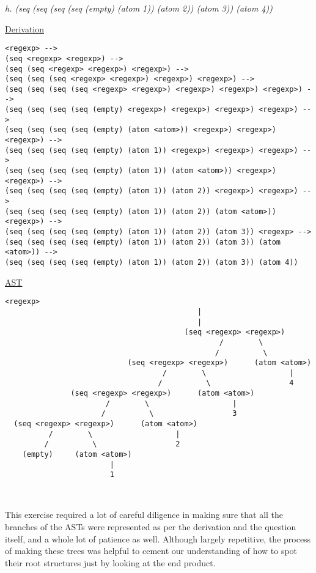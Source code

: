 \documentclass{article}
\begin{document}
\begin{quoting}
\textit{h. (seq (seq (seq (seq (empty) (atom 1)) (atom 2)) (atom 3)) (atom 4))}
\end{quoting}

\underline{Derivation}
\begin{lstlisting}[language=vasu]
<regexp> --> 
(seq <regexp> <regexp>) -->
(seq (seq <regexp> <regexp>) <regexp>) -->
(seq (seq (seq <regexp> <regexp>) <regexp>) <regexp>) -->
(seq (seq (seq (seq <regexp> <regexp>) <regexp>) <regexp>) <regexp>) -->
(seq (seq (seq (seq (empty) <regexp>) <regexp>) <regexp>) <regexp>) -->
(seq (seq (seq (seq (empty) (atom <atom>)) <regexp>) <regexp>) <regexp>) -->
(seq (seq (seq (seq (empty) (atom 1)) <regexp>) <regexp>) <regexp>) -->
(seq (seq (seq (seq (empty) (atom 1)) (atom <atom>)) <regexp>) <regexp>) -->
(seq (seq (seq (seq (empty) (atom 1)) (atom 2)) <regexp>) <regexp>) -->
(seq (seq (seq (seq (empty) (atom 1)) (atom 2)) (atom <atom>)) <regexp>) -->
(seq (seq (seq (seq (empty) (atom 1)) (atom 2)) (atom 3)) <regexp> -->
(seq (seq (seq (seq (empty) (atom 1)) (atom 2)) (atom 3)) (atom <atom>)) -->
(seq (seq (seq (seq (empty) (atom 1)) (atom 2)) (atom 3)) (atom 4))

\end{lstlisting}

\underline{AST}
\begin{lstlisting}[language=vasu]
                                        <regexp>
                                            |
                                            |
                                         (seq <regexp> <regexp>)
                                                 /        \
                                                /          \
                            (seq <regexp> <regexp>)      (atom <atom>)
                                    /        \                   |
                                   /          \                  4
               (seq <regexp> <regexp>)      (atom <atom>)
                       /        \                   |
                      /          \                  3
  (seq <regexp> <regexp>)      (atom <atom>)
          /        \                   |
         /          \                  2
    (empty)     (atom <atom>)
                        |
                        1
      
      
\end{lstlisting}

This exercise required a lot of careful diligence in making sure that all the branches of the ASTs were represented as per the derivation and the question itself, and a whole lot of patience as well. Although largely repetitive, the process of making these trees was helpful to cement our understanding of how to spot their root structures just by looking at the end product.
\end{document}
